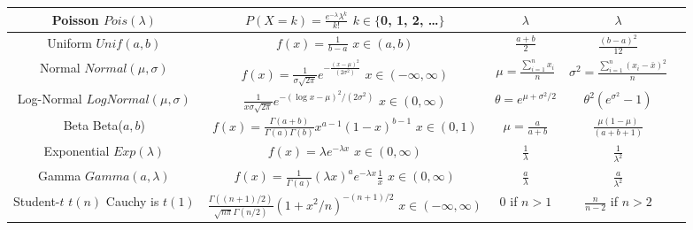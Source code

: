 \documentclass[12pt,]{krantz}
\theoremstyle{definition}
\theoremstyle{definition}
\theoremstyle{definition}
\theoremstyle{remark}
\begin{document}
\begin{center}
\begin{tabular}{ccccc}
\shortstack{Poisson \\ $Pois(\lambda)$} & \shortstack{$P(X=k) = \frac{e^{-\lambda}\lambda^k}{k!}$ \\ $k \in \{$0, 1, 2, \dots $\}$} & $\lambda$ & $\lambda$ \\
\hline
\shortstack{Uniform \\ $Unif(a, b)$} & \shortstack{$ f(x) = \frac{1}{b-a}$ \\$ x \in (a, b) $} & $\frac{a+b}{2}$ & $\frac{(b-a)^2}{12}$ \\
\hline
\shortstack{Normal \\ $Normal(\mu, \sigma)$} & \shortstack{$f(x) = \frac{1}{\sigma \sqrt{2\pi}} e^{-\frac{(x - \mu)^2}{(2 \sigma^2)}}$ \\ $x \in (-\infty, \infty)$} & $\mu =  \frac{\sum_{i=1}^n x_i}{n}$ & $\sigma^2 = \frac{\sum_{i=1}^n (x_i-\bar{x})^2}{n}$ \\
\hline
\shortstack{Log-Normal \\ $LogNormal(\mu,\sigma)$} & \shortstack{$\frac{1}{x\sigma \sqrt{2\pi}}e^{-(\log x - \mu)^2/(2\sigma^2)}$\\$x \in (0, \infty)$} & $\theta = e^{ \mu + \sigma^2/2}$ & $\theta^2 (e^{\sigma^2} - 1)$ \\
\hline
\shortstack{Beta \\ Beta($a, b$)} & \shortstack{$f(x) = \frac{\Gamma(a+b)}{\Gamma(a)\Gamma(b)}x^{a-1}(1-x)^{b-1}$\\$x \in (0, 1) $} & $\mu = \frac{a}{a + b}$  & $\frac{\mu(1-\mu)}{(a + b + 1)}$  \\
\hline
\shortstack{Exponential \\ $Exp(\lambda)$} & \shortstack{$f(x) = \lambda e^{-\lambda x}$\\$ x \in (0, \infty)$} & $\frac{1}{\lambda}$  & $\frac{1}{\lambda^2}$ \\
\hline
\shortstack{Gamma \\ $Gamma(a, \lambda)$} & \shortstack{$f(x) = \frac{1}{\Gamma(a)}(\lambda x)^ae^{-\lambda x}\frac{1}{x}$\\$ x \in (0, \infty)$} & $\frac{a}{\lambda}$  & $\frac{a}{\lambda^2}$ \\
\hline
\shortstack{Student-$t$ \\ $t(n)$ \\ Cauchy is $t(1)$} & \shortstack{$\frac{\Gamma((n+1)/2)}{\sqrt{n\pi} \Gamma(n/2)} (1+x^2/n)^{-(n+1)/2}$\\$x \in (-\infty, \infty)$} & $0$ if $n>1$ & $\frac{n}{n-2}$ if $n>2$ \\
\hline
\end{tabular}
\end{center}



\backmatter
\printindex
\end{document}
